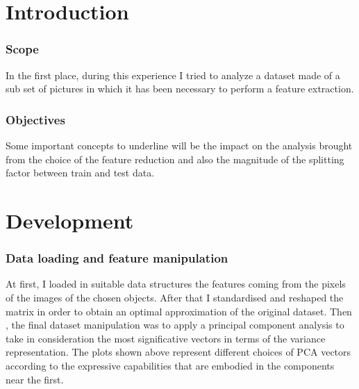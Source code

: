 \documentclass{article}
\begin{document}
			\renewcommand{\lstlistingname}{Code}

			
			\part{Introduction}
			
				\section{Scope}
In the first place, during this experience I tried to analyze a dataset made of a sub set of pictures in which it has been necessary to perform a feature extraction. 
				\section{Objectives}
				Some important concepts to underline will be the impact on the analysis brought from the choice of the feature reduction and also the magnitude of the splitting factor between train and test data.
\newpage
			\part{Development}
				\section{Data loading and feature manipulation}
	At first, I loaded in suitable data structures the features coming from the pixels of the images of the chosen objects.
	After that I standardised and reshaped the matrix in order to obtain an optimal approximation of the original dataset.
	Then , the final dataset manipulation was to apply a principal component analysis to take in consideration the most significative vectors in terms of the variance representation.
	The plots shown above represent different choices of PCA vectors according to the expressive capabilities that are embodied in the components near the first.
	  
\end{document}
